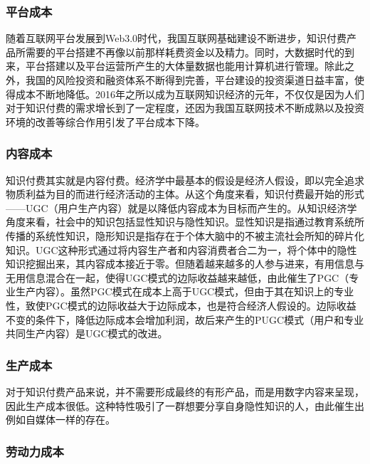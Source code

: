 \documentclass[UTF8,a4paper,12pt]{ctexart}  %
\begin{document}
\hypertarget{section-4}{%
\subsubsection{平台成本}\label{section-4}}

随着互联网平台发展到Web3.0时代，我国互联网基础建设不断进步，知识付费产品所需要的平台搭建不再像以前那样耗费资金以及精力。同时，大数据时代的到来，平台搭建以及平台运营所产生的大体量数据也能用计算机进行管理。除此之外，我国的风险投资和融资体系不断得到完善，平台建设的投资渠道日益丰富，使得成本不断地降低。2016年之所以成为互联网知识经济的元年，不仅仅是因为人们对于知识付费的需求增长到了一定程度，还因为我国互联网技术不断成熟以及投资环境的改善等综合作用引发了平台成本下降。

\hypertarget{section-5}{%
\subsubsection{内容成本}\label{section-5}}

知识付费其实就是内容付费。经济学中最基本的假设是经济人假设，即以完全追求物质利益为目的而进行经济活动的主体。从这个角度来看，知识付费最开始的形式------UGC（用户生产内容）就是以降低内容成本为目标而产生的。从知识经济学角度来看，社会中的知识包括显性知识与隐性知识。显性知识是指通过教育系统所传播的系统性知识，隐形知识是指存在于个体大脑中的不被主流社会所知的碎片化知识。UGC这种形式通过将内容生产者和内容消费者合二为一，将个体中的隐性知识挖掘出来，其内容成本接近于零。但随着越来越多的人参与进来，有用信息与无用信息混合在一起，使得UGC模式的边际收益越来越低，由此催生了PGC（专业生产内容）。虽然PGC模式在成本上高于UGC模式，但由于其在知识上的专业性，致使PGC模式的边际收益大于边际成本，也是符合经济人假设的。边际收益不变的条件下，降低边际成本会增加利润，故后来产生的PUGC模式（用户和专业共同生产内容）是UGC模式的改进。

\hypertarget{section-6}{%
\subsubsection{生产成本}\label{section-6}}

对于知识付费产品来说，并不需要形成最终的有形产品，而是用数字内容来呈现，因此生产成本很低。这种特性吸引了一群想要分享自身隐性知识的人，由此催生出例如自媒体一样的存在。

\hypertarget{section-7}{%
\subsubsection{劳动力成本}\label{section-7}}
\end{document}
